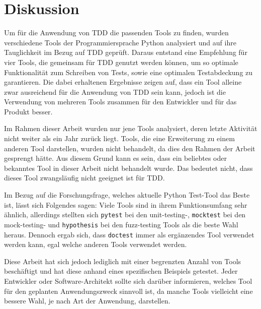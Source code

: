 \section{Diskussion}\label{diskussion}
Um für die Anwendung von TDD die passenden Tools zu finden, wurden verschiedene
Tools der Programmiersprache Python analysiert und auf ihre Tauglichkeit im
Bezug auf TDD geprüft. Daraus entstand eine Empfehlung für vier Tools, die
gemeinsam für TDD genutzt werden können, um so optimale Funktionalität zum
Schreiben von Tests, sowie eine optimalen Testabdeckung zu garantieren. Die 
dabei erhaltenen Ergebnisse zeigen auf, dass ein Tool alleine zwar ausreichend 
für die Anwendung von TDD sein kann, jedoch ist die Verwendung von mehreren 
Tools zusammen für den Entwickler und für das Produkt besser.

Im Rahmen dieser Arbeit wurden nur jene Tools analysiert, deren letzte
Aktivität nicht weiter als ein Jahr zurück liegt. Tools, die eine Erweiterung zu
einem anderen Tool darstellen, wurden nicht behandelt, da dies den Rahmen der
Arbeit gesprengt hätte. Aus diesem Grund kann es sein, dass ein beliebtes oder
bekanntes Tool in dieser Arbeit nicht behandelt wurde. Das bedeutet nicht, dass
dieses Tool zwangsläufig nicht geeignet ist für TDD.

Im Bezug auf die Forschungsfrage, welches aktuelle Python Test-Tool das Beste 
ist, lässt sich Folgendes sagen: Viele Tools sind in ihrem Funktionsumfang sehr 
ähnlich, allerdings stellten sich \lstinline{pytest} bei den unit-testing-, 
\lstinline{mocktest} bei den mock-testing- und \lstinline{hypothesis} bei den 
fuzz-testing Tools als die beste Wahl heraus. Dennoch ergab sich, dass 
\lstinline{doctest} immer als ergänzendes Tool verwendet werden kann, egal 
welche anderen Tools verwendet werden.

Diese Arbeit hat sich jedoch lediglich mit einer begrenzten Anzahl von Tools 
beschäftigt und hat diese anhand eines spezifischen Beispiels getestet. Jeder 
Entwickler oder Software-Architekt sollte sich darüber informieren, welches 
Tool für den geplanten Anwendungszweck sinnvoll ist, da manche Tools 
vielleicht eine bessere Wahl, je nach Art der Anwendung, darstellen.
